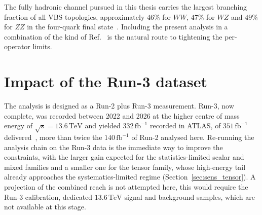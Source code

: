 The fully hadronic channel pursued in this thesis carries the largest branching fraction of all VBS topologies, approximately $46\%$ for $WW$, $47\%$ for $WZ$ and $49\%$ for $ZZ$ in the four-quark final state~\cite{ParticleDataGroup:2024cfk}. Including the present analysis in a combination of the kind of Ref.~\cite{ATLAS:VBStribosoncombination:2026} is the natural route to tightening the per-operator limits.

\section{Impact of the Run-3 dataset}
\label{sec:outlook_run3}

The analysis is designed as a Run-2 plus Run-3 measurement. Run-3, now complete, was recorded between 2022 and 2026 at the higher centre of mass energy of $\sqrt{s}=13.6\,\mathrm{TeV}$ and yielded $332\,\mathrm{fb}^{-1}$ recorded in ATLAS, of $351\,\mathrm{fb}^{-1}$ delivered~\cite{ATLAS:lumiRun3}, more than twice the $140\,\mathrm{fb}^{-1}$ of Run-2 analysed here. Re-running the analysis chain on the Run-3 data is the immediate way to improve the constraints, with the larger gain expected for the statistics-limited scalar and mixed families and a smaller one for the tensor family, whose high-energy tail already approaches the systematics-limited regime (Section~\ref{sec:sens_tensor}). A projection of the combined reach is not attempted here, this would require the Run-3 calibration, dedicated $13.6\,\mathrm{TeV}$ signal and background samples, which are not available at this stage.
